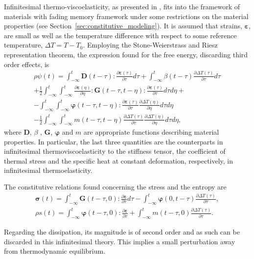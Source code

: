 Infinitesimal thermo-viscoelasticity, as presented in \cite{christensen2013theory}, fits into the framework of materials with fading memory framework under some restrictions on the material properties (see Section~\ref{sec:constitutive_modeling}).
It is assumed that strains, $\bm \varepsilon$, are small as well as the temperature difference with respect to some reference temperature, $\Delta T=T-T_0$.
Employing the Stone-Weierstrass and Riesz representation theorem, the expression found for the free energy, discarding third order effects, is
\begin{multline}
  \rho\psi(t) = \int_{-\infty}^t \mathbf D(t-\tau):\frac{\partial \bm\varepsilon(\tau)}{\partial \tau}d\tau + \int_{-\infty}^t \beta(t-\tau)\frac{\partial \Delta T(\tau)}{\partial \tau}d\tau\\ + \frac{1}{2}\int_{-\infty}^t\int_{-\infty}^t \frac{\partial \bm\varepsilon(\eta)}{\partial \eta}:\mathbf G(t-\tau, t-\eta):\frac{\partial \bm \varepsilon(\tau)}{\partial \tau}d\tau d\eta + \\
  -\int_{-\infty}^t \int_{-\infty}^t \bm\varphi(t-\tau, t-\eta):\frac{\partial \bm\varepsilon(\tau)}{\partial \tau} \frac{\partial \Delta T(\eta)}{\partial \eta} d \tau d \eta\\
  -\frac{1}{2} \int_{-\infty}^t \int_{-\infty}^t m(t-\tau, t-\eta) \frac{\partial \Delta T(\tau)}{\partial \tau} \frac{\partial \Delta T(\eta)}{\partial \eta} d \tau d \eta,
  \end{multline}
where $\mathbf D$, $\beta$ , $\mathbf G$, $\bm \varphi$ and $m$ are appropriate functions describing  material properties.
In particular, the last three quantities are the counterparts in infinitesimal thermoviscoelasticity to the stiffness tensor, the coefficient of thermal stress and the specific heat at constant deformation, respectively, in infinitesimal thermoelasticity.

The constitutive relations found concerning the stress and the entropy are
\begin{gather}
  \bm \sigma(t) = \int_{-\infty}^t \mathbf G(t-\tau, 0):\frac{\partial\bm\varepsilon}{\partial \tau} d\tau-\int_{-\infty}^t \bm\varphi(0, t-\tau)\frac{\partial \Delta T(\tau)}{\partial \tau},\\
  \rho s(t) = \int_{-\infty}^t \bm\varphi(t-\tau, 0):\frac{\partial \bm \varepsilon}{\partial \tau} + \int_{-\infty}^t m(t-\tau, 0)\frac{\partial \Delta T(\tau)}{\partial \tau}.
\end{gather}

Regarding the dissipation, its magnitude is of second order and as such can be discarded in this infinitesimal theory.
This implies a small perturbation away from thermodynamic equilibrium.

